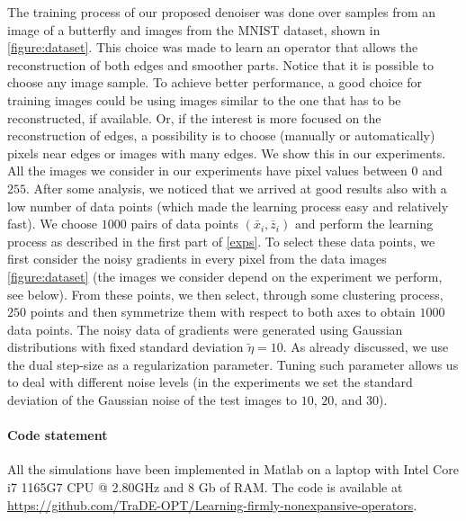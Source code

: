 \documentclass[onefignum,onetabnum]{siamonline250211}
\begin{document}
The training process of our proposed denoiser was done over samples from an image of a butterfly and images from the MNIST dataset, shown in \cref{figure:dataset}. This choice was made to learn an operator that allows the reconstruction of both edges and smoother parts. Notice that it is possible to choose any image sample. To achieve better performance, a good choice for training images could be using images similar to the one that has to be reconstructed, if available. Or, if the interest is more focused on the reconstruction of edges, a possibility is to choose (manually or automatically) pixels near edges or images with many edges. We show this in our experiments. All the images we consider in our experiments have pixel values between $0$ and $255$. After some analysis, we noticed that we arrived at good results also with a low number of data points (which made the learning process easy and relatively fast). We choose $1000$ pairs of data points $(\bar x_i,\bar z_i)$ and perform the learning process as described in the first part of \cref{exps}. To select these data points, we first consider the noisy gradients in every pixel from the data images \cref{figure:dataset} (the images we consider depend on the experiment we perform, see below). From these points, we then select, through some clustering process, $250$ points and then symmetrize them with respect to both axes to obtain $1000$ data points. The noisy data of gradients were generated using Gaussian distributions with fixed standard deviation $\tilde \eta =10$. As already discussed, we use the dual step-size as a regularization parameter. Tuning such parameter allows us to deal with different noise levels (in the experiments we set the standard deviation of the Gaussian noise of the test images to $10$, $20$, and $30$).

\paragraph{Code statement} All the simulations have been implemented in Matlab on a laptop with Intel Core i7 1165G7 CPU @ 2.80GHz and 8 Gb of RAM. The code is available at
\url{https://github.com/TraDE-OPT/Learning-firmly-nonexpansive-operators}.
\end{document}
